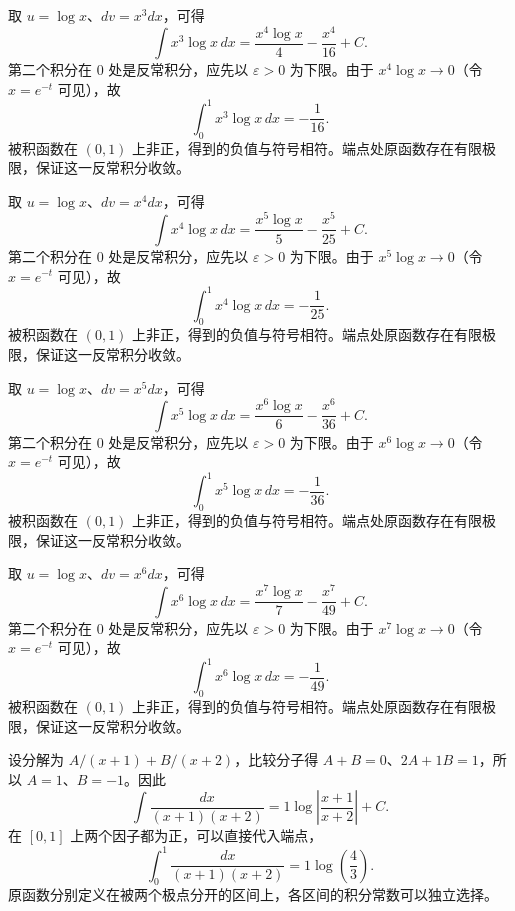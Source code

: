 \documentclass[12pt,fontset=fandol]{ctexart}
\begin{document}
\begin{solve}\label{ans:c13q9}
取 $u=\log x$、$dv=x^{3}dx$，可得
\[
\int x^{3}\log x\,dx=\frac{x^{4}\log x}{4}-\frac{x^{4}}{16}+C.
\]
第二个积分在 $0$ 处是反常积分，应先以 $\varepsilon>0$ 为下限。由于 $x^{4}\log x\to0$（令 $x=e^{-t}$ 可见），故
\[
\int_0^1x^{3}\log x\,dx=-\frac{1}{16}.
\]
被积函数在 $(0,1)$ 上非正，得到的负值与符号相符。端点处原函数存在有限极限，保证这一反常积分收敛。
\end{solve}

\begin{solve}\label{ans:c13q10}
取 $u=\log x$、$dv=x^{4}dx$，可得
\[
\int x^{4}\log x\,dx=\frac{x^{5}\log x}{5}-\frac{x^{5}}{25}+C.
\]
第二个积分在 $0$ 处是反常积分，应先以 $\varepsilon>0$ 为下限。由于 $x^{5}\log x\to0$（令 $x=e^{-t}$ 可见），故
\[
\int_0^1x^{4}\log x\,dx=-\frac{1}{25}.
\]
被积函数在 $(0,1)$ 上非正，得到的负值与符号相符。端点处原函数存在有限极限，保证这一反常积分收敛。
\end{solve}

\begin{solve}\label{ans:c13q11}
取 $u=\log x$、$dv=x^{5}dx$，可得
\[
\int x^{5}\log x\,dx=\frac{x^{6}\log x}{6}-\frac{x^{6}}{36}+C.
\]
第二个积分在 $0$ 处是反常积分，应先以 $\varepsilon>0$ 为下限。由于 $x^{6}\log x\to0$（令 $x=e^{-t}$ 可见），故
\[
\int_0^1x^{5}\log x\,dx=-\frac{1}{36}.
\]
被积函数在 $(0,1)$ 上非正，得到的负值与符号相符。端点处原函数存在有限极限，保证这一反常积分收敛。
\end{solve}

\begin{solve}\label{ans:c13q12}
取 $u=\log x$、$dv=x^{6}dx$，可得
\[
\int x^{6}\log x\,dx=\frac{x^{7}\log x}{7}-\frac{x^{7}}{49}+C.
\]
第二个积分在 $0$ 处是反常积分，应先以 $\varepsilon>0$ 为下限。由于 $x^{7}\log x\to0$（令 $x=e^{-t}$ 可见），故
\[
\int_0^1x^{6}\log x\,dx=-\frac{1}{49}.
\]
被积函数在 $(0,1)$ 上非正，得到的负值与符号相符。端点处原函数存在有限极限，保证这一反常积分收敛。
\end{solve}

\begin{solve}\label{ans:c13q13}
设分解为 $A/(x+1)+B/(x+2)$，比较分子得 $A+B=0$、$2A+1B=1$，所以 $A=1$、$B=-1$。因此
\[
\int\frac{dx}{(x+1)(x+2)}=1\log\left|\frac{x+1}{x+2}\right|+C.
\]
在 $[0,1]$ 上两个因子都为正，可以直接代入端点，
\[
\int_0^1\frac{dx}{(x+1)(x+2)}=1\log\left(\frac{4}{3}\right).
\]
原函数分别定义在被两个极点分开的区间上，各区间的积分常数可以独立选择。
\end{solve}
\end{document}
